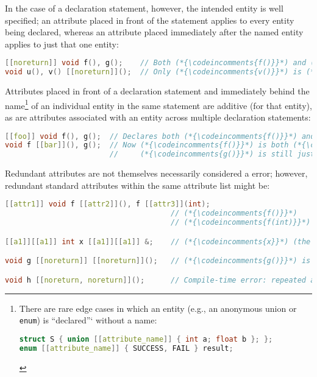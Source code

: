 \documentclass[twoside,10pt,letterpaper,usenames]{newstyle-PearsonGeneric-7-38}
\newcommand{\codeincomments}{\color{skyblue}\ttfamily}
\begin{document}
In the case of a declaration statement, however, the intended entity is
well specified; an attribute placed in front of the statement applies to
every entity being declared, whereas an attribute placed immediately
after the named entity applies to just that one entity:

\begin{lstlisting}[language=C++]
[[noreturn]] void f(), g();    // Both (*{\codeincomments{f()}}*) and (*{\codeincomments{g()}}*) are (*{\codeincomments{noreturn}}*).
void u(), v() [[noreturn]]();  // Only (*{\codeincomments{v()}}*) is (*{\codeincomments{noreturn}}*).
\end{lstlisting}
    

Attributes placed in front of a declaration statement and immediately
behind the name{\cprotect\footnote{There are rare edge cases in which an
entity (e.g., an anonymous union or \texttt{enum}) is ``declared''`
without a name:

\begin{lstlisting}[language=C++, basicstyle={\ttfamily\footnotesize}]
struct S { union [[attribute_name]] { int a; float b }; };
enum [[attribute_name]] { SUCCESS, FAIL } result;
\end{lstlisting}
}} of an individual entity in the same statement are additive (for
that entity), as are attributes associated with an entity across
multiple declaration statements:

\begin{lstlisting}[language=C++]
[[foo]] void f(), g();  // Declares both (*{\codeincomments{f()}}*) and (*{\codeincomments{g()}}*) to be (*{\codeincomments{foo}}*).
void f [[bar]](), g();  // Now (*{\codeincomments{f()}}*) is both (*{\codeincomments{foo}}*) and (*{\codeincomments{bar}}*) while
                        //     (*{\codeincomments{g()}}*) is still just (*{\codeincomments{foo}}*).
\end{lstlisting}
    

Redundant attributes are not themselves necessarily considered a error;
however, redundant standard attributes within the same attribute list
might be:

\begin{lstlisting}[language=C++]
[[attr1]] void f [[attr2]](), f [[attr3]](int);
                                      // (*{\codeincomments{f()}}*)    is (*{\codeincomments{attr1}}*) and (*{\codeincomments{attr2}}*)
                                      // (*{\codeincomments{f(int)}}*) is (*{\codeincomments{attr1}}*) and (*{\codeincomments{attr3}}*)

[[a1]][[a1]] int x [[a1]][[a1]] &;    // (*{\codeincomments{x}}*) (the reference itself) is (*{\codeincomments{a1}}*)

void g [[noreturn]] [[noreturn]]();   // (*{\codeincomments{g()}}*) is (*{\codeincomments{noreturn}}*)

void h [[noreturn, noreturn]]();      // Compile-time error: repeated attribute
\end{lstlisting}
    
\end{document}
